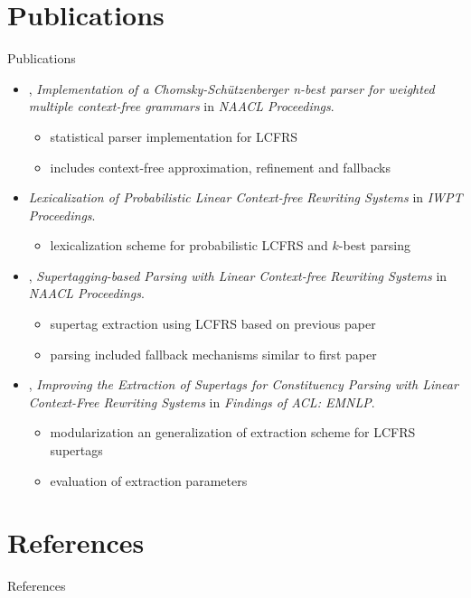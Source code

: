 \documentclass[aspectratio=169, 10pt]{beamer}
\begin{document}
    \section{Publications}
    \begin{frame}{Publications}
        \begin{itemize}
            \item \citealp*{RupDen19}, \emph{Implementation of a {C}homsky-Sch{\"u}tzenberger n-best parser for weighted multiple context-free grammars} in \emph{NAACL Proceedings}.
                \begin{itemize}
                    \item statistical parser implementation for LCFRS
                    \item includes context-free approximation, refinement and fallbacks
                \end{itemize}
            \item \citealp{MoeRup20}\emph{Lexicalization of Probabilistic Linear Context-free Rewriting Systems} in \emph{IWPT Proceedings}.
                \begin{itemize}
                    \item lexicalization scheme for probabilistic LCFRS and $k$-best parsing
                \end{itemize}
            \item \citealp{RupMoe21}, \emph{Supertagging-based Parsing with Linear Context-free Rewriting Systems} in \emph{NAACL Proceedings}.
                \begin{itemize}
                    \item supertag extraction using LCFRS based on previous paper
                    \item parsing included fallback mechanisms similar to first paper
                \end{itemize}
            \item \citealp{Rup22}, \emph{Improving the Extraction of Supertags for Constituency Parsing with Linear Context-Free Rewriting Systems} in \emph{Findings of ACL: EMNLP}.
                \begin{itemize}
                    \item modularization an generalization of extraction scheme for LCFRS supertags
                    \item evaluation of extraction parameters
                \end{itemize}
        \end{itemize}
    \end{frame}


    \section*{References}
    \begin{frame}{References}
        \footnotesize
        
        
    \end{frame}
\end{document}
